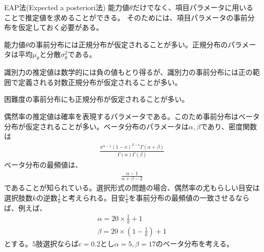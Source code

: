 \documentclass[aspectratio=169, dvipdfmx, 12pt]{beamer}
\begin{document}
\begin{frame}
  \begin{block}{EAP法(Expected a posteriori法)}
    能力値$\theta$だけでなく、項目パラメータに用いることで推定値を求めることができる。
    そのためには、項目パラメータの事前分布を仮定しておく必要がある。
    \begin{description}[labelwidth=10em]
      \item[能力値$\theta$の事前分布] 能力値$\theta$の事前分布には正規分布が仮定されることが多い。正規分布のパラメータは平均$\mu_\theta$と分散${\sigma}^2 _\theta$である。
      \item[識別力$a$の事前分布] 識別力の推定値は数学的には負の値もとり得るが、識別力の事前分布には正の範囲で定義される対数正規分布が仮定されることが多い。
      \item[困難度$b$の事前分布] 困難度の事前分布にも正規分布が仮定されることが多い。
      \item[偶然率$c$の事前分布] 偶然率の推定値は確率を表現するパラメータである。このため事前分布はベータ分布が仮定されることが多い。ベータ分布のパラメータは$\alpha,\beta$であり、密度関数は
      \begin{align}
        \displaystyle
        \frac{x^{\alpha - 1} (1 - x)^{\beta - 1}\Gamma(\alpha + \beta)}{\Gamma(\alpha) \Gamma(\beta)}
      \end{align}
      ベータ分布の最頻値は、
      \begin{align}
        \displaystyle
        \frac{\alpha - 1}{\alpha + \beta- 2}
      \end{align}
      であることが知られている。選択形式の問題の場合、偶然率の尤もらしい目安は選択肢数$k$の逆数$\frac{1}{k}$と考えられる。目安$\frac{1}{k}$を事前分布の最頻値の一致させるならば、例えば、
      \begin{align}
        \displaystyle
        \alpha = 20 \times \frac{1}{k} + 1\\
        \beta = 20 \times (1 - \frac{1}{k}) + 1
      \end{align}
      とする。$5$肢選択ならば$c = 0.2$とし$\alpha = 5,\beta = 17$のベータ分布を考える。
    \end{description}
  \end{block}
\end{frame}
\end{document}
